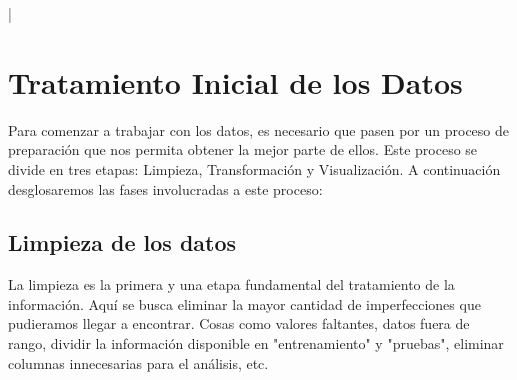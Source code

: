 |\documentclass{article}
\begin{document}
\section{Tratamiento Inicial de los Datos}

Para comenzar a trabajar con los datos, es necesario que pasen por un proceso de preparación que nos permita obtener la mejor parte de ellos. Este proceso se divide en tres etapas: Limpieza, Transformación y Visualización. A continuación desglosaremos las fases involucradas a este proceso:

    \subsection{Limpieza de los datos}

        La limpieza es la primera y una etapa fundamental del tratamiento de la información. Aquí se busca eliminar la mayor cantidad de imperfecciones que pudieramos llegar a encontrar. Cosas como valores faltantes, datos fuera de rango, dividir la información disponible en "entrenamiento" y "pruebas", eliminar columnas innecesarias para el análisis, etc.\\
\end{document}
